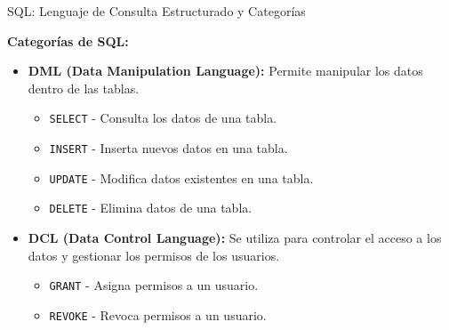 \documentclass[spanish]{beamer}
\begin{document}
\begin{frame}{SQL: Lenguaje de Consulta Estructurado y Categorías}
    \begin{tcolorbox}[title=SQL,colback=orange!5!white,colframe=orange!75!black]
        \textbf{Categorías de SQL:}  
        \begin{itemize}
            \item \textbf{DML (Data Manipulation Language):}  
                Permite manipular los datos dentro de las tablas.  
                \begin{itemize}
                    \item \texttt{SELECT} - Consulta los datos de una tabla.
                    \item \texttt{INSERT} - Inserta nuevos datos en una tabla.
                    \item \texttt{UPDATE} - Modifica datos existentes en una tabla.
                    \item \texttt{DELETE} - Elimina datos de una tabla.
                \end{itemize}

            \item \textbf{DCL (Data Control Language):}  
                Se utiliza para controlar el acceso a los datos y gestionar los permisos de los usuarios.  
                \begin{itemize}
                    \item \texttt{GRANT} - Asigna permisos a un usuario.
                    \item \texttt{REVOKE} - Revoca permisos a un usuario.
                \end{itemize}


              
      
        \end{itemize}
    \end{tcolorbox}
\end{frame}
\end{document}
